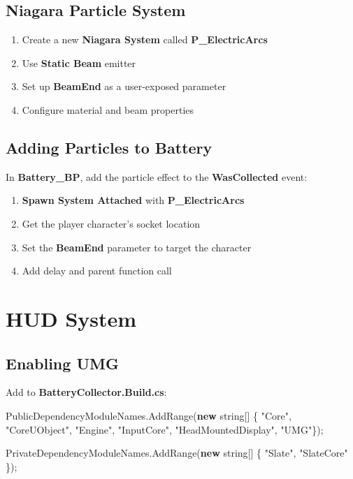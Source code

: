 \documentclass[
  letterpaper,
  DIV=11,
  numbers=noendperiod]{scrartcl}
\newenvironment{Shaded}{\begin{snugshade}}{\end{snugshade}}
\newcommand{\DataTypeTok}[1]{\textcolor[rgb]{0.68,0.00,0.00}{#1}}
\newcommand{\FunctionTok}[1]{\textcolor[rgb]{0.28,0.35,0.67}{#1}}
\newcommand{\KeywordTok}[1]{\textcolor[rgb]{0.00,0.23,0.31}{\textbf{#1}}}
\newcommand{\NormalTok}[1]{\textcolor[rgb]{0.00,0.23,0.31}{#1}}
\newcommand{\OperatorTok}[1]{\textcolor[rgb]{0.37,0.37,0.37}{#1}}
\newcommand{\StringTok}[1]{\textcolor[rgb]{0.13,0.47,0.30}{#1}}
\providecommand{\tightlist}{%
  \setlength{\itemsep}{0pt}\setlength{\parskip}{0pt}}
\begin{document}
\subsection{Niagara Particle System}\label{niagara-particle-system}

\begin{enumerate}
\def\labelenumi{\arabic{enumi}.}
\tightlist
\item
  Create a new \textbf{Niagara System} called \textbf{P\_ElectricArcs}
\item
  Use \textbf{Static Beam} emitter
\item
  Set up \textbf{BeamEnd} as a user-exposed parameter
\item
  Configure material and beam properties
\end{enumerate}

\subsection{Adding Particles to
Battery}\label{adding-particles-to-battery}

In \textbf{Battery\_BP}, add the particle effect to the
\textbf{WasCollected} event:

\begin{enumerate}
\def\labelenumi{\arabic{enumi}.}
\tightlist
\item
  \textbf{Spawn System Attached} with \textbf{P\_ElectricArcs}
\item
  Get the player character's socket location
\item
  Set the \textbf{BeamEnd} parameter to target the character
\item
  Add delay and parent function call
\end{enumerate}

\section{HUD System}\label{hud-system}

\subsection{Enabling UMG}\label{enabling-umg}

Add to \textbf{BatteryCollector.Build.cs}:

\begin{Shaded}
\begin{Highlighting}[]
\NormalTok{PublicDependencyModuleNames}\OperatorTok{.}\FunctionTok{AddRange}\OperatorTok{(}\KeywordTok{new} \DataTypeTok{string}\OperatorTok{[]} \OperatorTok{\{} \StringTok{"Core"}\OperatorTok{,} \StringTok{"CoreUObject"}\OperatorTok{,} \StringTok{"Engine"}\OperatorTok{,} \StringTok{"InputCore"}\OperatorTok{,} \StringTok{"HeadMountedDisplay"}\OperatorTok{,} \StringTok{"UMG"}\OperatorTok{\});}

\NormalTok{PrivateDependencyModuleNames}\OperatorTok{.}\FunctionTok{AddRange}\OperatorTok{(}\KeywordTok{new} \DataTypeTok{string}\OperatorTok{[]} \OperatorTok{\{} \StringTok{"Slate"}\OperatorTok{,} \StringTok{"SlateCore"} \OperatorTok{\});}
\end{Highlighting}
\end{Shaded}
\end{document}
